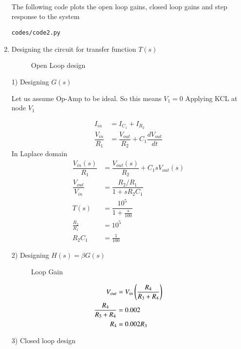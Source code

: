\begin{enumerate}[label=\thesection.\arabic*.,ref=\thesection.\theenumi]
The following code plots the open loop gains, closed loop gains and step response to the system
\begin{lstlisting}
codes/code2.py
\end{lstlisting}


\item Designing the circuit for transfer function $T(s)$
\begin{figure}[!hbt]
	\begin{center}
			\resizebox{\columnwidth}{!}{}
	\end{center}
\caption{Open Loop design}
\label{fig:equivalent_system1}
\end{figure}

1) Designing $G(s)$

Let us assume Op-Amp to be ideal. So this means $V_{1}=0$
Applying KCL at node $V_{1}$

\begin{align}
I_{in} &= I_{C_{1}} + I_{R_{2}}
\\
\dfrac{V_{in}}{R_{1}} &= \dfrac{V_{out}}{R_{2}} + C_{1}\dfrac{dV_{out}}{dt}
\end{align}
In Laplace domain
\begin{align}
\dfrac{V_{in}(s)}{R_{1}} &= \dfrac{V_{out}(s)}{R_{2}} + C_{1}sV_{out}(s)
\\
\dfrac{V_{out}}{V_{in}} &= \dfrac{R_{2}/R_{1}}{1+sR_{2}C_{1}}
\\
T(s) &= \dfrac{10^{5}}{1+\frac{s}{100}}
\\
\frac{R_{2}}{R_{1}} &= 10^{5}
\\
R_{2}C_{1} &= \frac{1}{100}
\end{align}


2) Designing $H(s) = \beta G(s)$

\begin{figure}[!hbt]
	\begin{center}
			\resizebox{\columnwidth}{!}{}
	\end{center}
\caption{Loop Gain}
\label{fig:equivalent_system4}
\end{figure}

\begin{align}
	V_{out} &= V_{in} \left(\frac{R_{4}}{R_{3}+R_{4}}\right)
	\\
	{\frac{R_{4}}{R_{3}+R_{4}}} &= 0.002
	\\
	R_{4} &= 0.002 R_{3}
\end{align}

3) Closed loop design


\end{enumerate}
